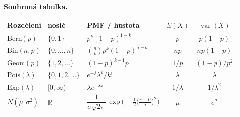 \documentclass[11pt,a4paper]{article}
\DeclareMathOperator{\Var}{var}
\newcommand{\R}{\mathbb{R}}
\begin{document}
\begin{poznamka}
\textbf{Souhrnná tabulka.}
\medskip

{\renewcommand{\arraystretch}{1.55}%
\setlength{\tabcolsep}{12pt}%
\noindent\begin{tabular}{l l l c c}
\toprule
\textbf{Rozdělení} & \textbf{nosič} & \textbf{PMF / hustota} & $E(X)$ & $\Var(X)$ \\
\midrule
$\mathrm{Bern}(p)$ & $\{0,1\}$ & $p^k(1-p)^{1-k}$ & $p$ & $p(1-p)$ \\
$\mathrm{Bin}(n,p)$ & $\{0,\dots,n\}$ & $\binom{n}{k}p^k(1-p)^{n-k}$ & $np$ & $np(1-p)$ \\
$\mathrm{Geom}(p)$ & $\{1,2,\dots\}$ & $(1-p)^{k-1}p$ & $1/p$ & $(1-p)/p^2$ \\
$\mathrm{Pois}(\lambda)$ & $\{0,1,2,\dots\}$ & $e^{-\lambda}\lambda^k/k!$ & $\lambda$ & $\lambda$ \\
$\mathrm{Exp}(\lambda)$ & $[0,\infty)$ & $\lambda e^{-\lambda x}$ & $1/\lambda$ & $1/\lambda^2$ \\
$N(\mu,\sigma^2)$ & $\R$ & $\dfrac{1}{\sigma\sqrt{2\pi}}\,\exp\!\bigl(-\tfrac{1}{2}\bigl(\tfrac{x-\mu}{\sigma}\bigr)^{2}\bigr)$ & $\mu$ & $\sigma^2$ \\
\bottomrule
\end{tabular}\par}
\end{poznamka}
\end{document}
